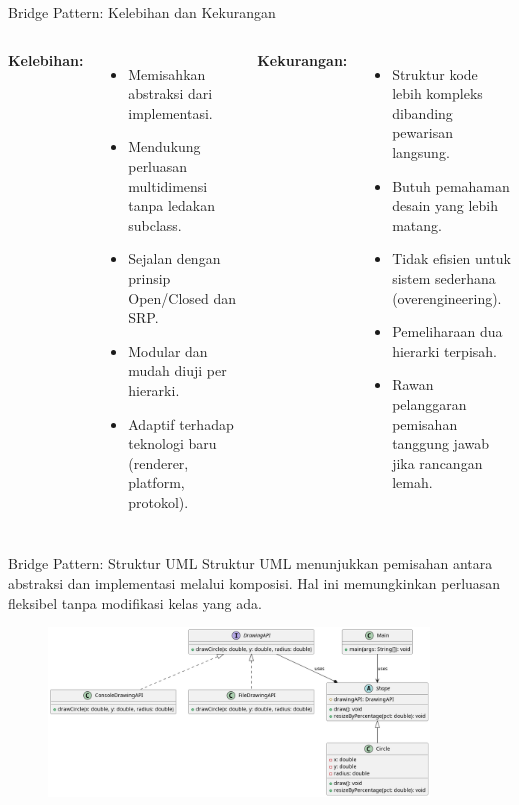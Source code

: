 \documentclass[aspectratio=169, table]{beamer}
\begin{document}
\begin{frame}[fragile]{Bridge Pattern: Kelebihan dan Kekurangan}
	\vspace{20pt}
	\begin{columns}[T]
		\textbf{Kelebihan:}
		\begin{itemize}
			\item Memisahkan abstraksi dari implementasi.
			\item Mendukung perluasan multidimensi tanpa ledakan subclass.
			\item Sejalan dengan prinsip Open/Closed dan SRP.
			\item Modular dan mudah diuji per hierarki.
			\item Adaptif terhadap teknologi baru (renderer, platform, protokol).
		\end{itemize}
		
		\textbf{Kekurangan:}
		\begin{itemize}
			\item Struktur kode lebih kompleks dibanding pewarisan langsung.
			\item Butuh pemahaman desain yang lebih matang.
			\item Tidak efisien untuk sistem sederhana (overengineering).
			\item Pemeliharaan dua hierarki terpisah.
			\item Rawan pelanggaran pemisahan tanggung jawab jika rancangan lemah.
		\end{itemize}
	\end{columns}
\end{frame}


\begin{frame}[fragile]{Bridge Pattern: Struktur UML}
	\vspace{20pt}
	Struktur UML menunjukkan pemisahan antara abstraksi dan implementasi melalui komposisi. 
	Hal ini memungkinkan perluasan fleksibel tanpa modifikasi kelas yang ada.
	
	\begin{figure}
		\centering
		\includegraphics[width=0.9\textwidth]{../../figures/out/bridge.png}
		\label{fig:bridge}
	\end{figure}
\end{frame}
\end{document}
